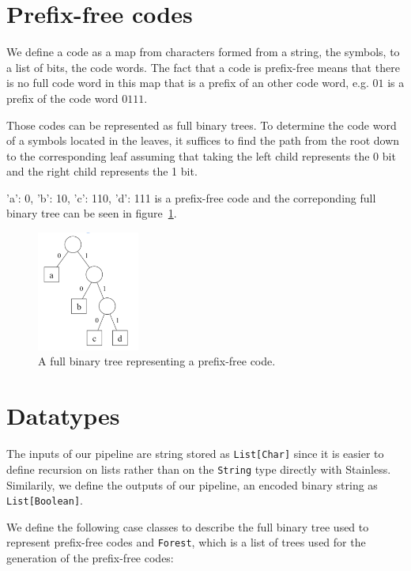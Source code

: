 \documentclass[a4paper,UKenglish,cleveref, autoref, thm-restate]{lipics-v2021}
\begin{document}
\section{Prefix-free codes}

We define a code as a map from characters formed from a string, the symbols, to a list of bits, the code words. The fact that a code is prefix-free means that there is no full code word in this map that is a prefix of an other code word, e.g. $01$ is a prefix of the code word $0111$.

Those codes can be represented as full binary trees. To determine the code word of a symbols located in the leaves, it suffices to find the path from the root down to the corresponding leaf assuming that taking the left child represents the 0 bit and the right child represents the 1 bit.

{'a': 0, 'b': 10, 'c': 110, 'd': 111} is a prefix-free code and the correponding full binary tree can be seen in figure~\ref{fig:pfc}.
\begin{figure}[ht]
    \centering
    \includegraphics[width=0.3\textwidth]{pfc.png}
    \caption{A full binary tree representing a prefix-free code.\label{fig:pfc}}
\end{figure}

\section{Datatypes}

The inputs of our pipeline are string stored as \lstinline{List[Char]} since it is easier to define recursion on lists rather than on the \lstinline{String} type directly with Stainless. 
Similarily, we define the outputs of our pipeline, an encoded binary string as \lstinline{List[Boolean]}.

We define the following case classes to describe the full binary tree used to represent prefix-free codes and \lstinline{Forest}, which is a list of trees used for the generation of the prefix-free codes:
\end{document}
